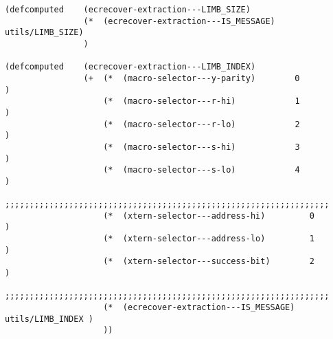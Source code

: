\documentclass[varwidth=\maxdimen,margin=0.5cm,multi={verbatim}]{standalone}
\begin{document}
\begin{verbatim}
(defcomputed    (ecrecover-extraction---LIMB_SIZE)
                (*  (ecrecover-extraction---IS_MESSAGE) utils/LIMB_SIZE)
                )

(defcomputed    (ecrecover-extraction---LIMB_INDEX)
                (+  (*  (macro-selector---y-parity)        0                         )
                    (*  (macro-selector---r-hi)            1                         )
                    (*  (macro-selector---r-lo)            2                         )
                    (*  (macro-selector---s-hi)            3                         )
                    (*  (macro-selector---s-lo)            4                         )
                    ;;;;;;;;;;;;;;;;;;;;;;;;;;;;;;;;;;;;;;;;;;;;;;;;;;;;;;;;;;;;;;;;;;
                    (*  (xtern-selector---address-hi)         0                      )
                    (*  (xtern-selector---address-lo)         1                      )
                    (*  (xtern-selector---success-bit)        2                      )
                    ;;;;;;;;;;;;;;;;;;;;;;;;;;;;;;;;;;;;;;;;;;;;;;;;;;;;;;;;;;;;;;;;;;
                    (*  (ecrecover-extraction---IS_MESSAGE)         utils/LIMB_INDEX )
                    ))

\end{verbatim}
\end{document}

